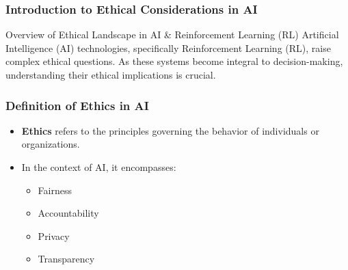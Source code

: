\documentclass[aspectratio=169]{beamer}
\begin{document}
\frame{\titlepage}

\begin{frame}[fragile]
    \frametitle{Introduction to Ethical Considerations in AI}
    \begin{block}{Overview of Ethical Landscape in AI \& Reinforcement Learning (RL)}
        Artificial Intelligence (AI) technologies, specifically Reinforcement Learning (RL), raise complex ethical questions. As these systems become integral to decision-making, understanding their ethical implications is crucial.
    \end{block}
\end{frame}

\begin{frame}[fragile]
    \frametitle{Definition of Ethics in AI}
    \begin{itemize}
        \item \textbf{Ethics} refers to the principles governing the behavior of individuals or organizations.
        \item In the context of AI, it encompasses:
            \begin{itemize}
                \item Fairness
                \item Accountability
                \item Privacy
                \item Transparency
            \end{itemize}
    \end{itemize}
\end{frame}
\end{document}
